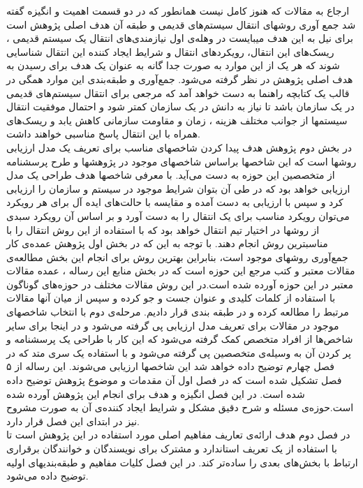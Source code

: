 ارجاع به مقالات که هنوز کامل نیست
همانطور که در دو قسمت اهمیت و انگیزه گفته شد جمع آوری روشهای انتقال سیستم‌های قدیمی و طبقه آن هدف اصلی پژوهش است برای نیل به این هدف میبایست در وهله‌ی اول نیازمندی‌های انتقال یک سیستم قدیمی ، ریسک‌های این انتقال،  رویکردهای انتقال و شرایط ایجاد کننده این انتقال شناسایی شوند که هر یک از این موارد به صورت جدا گانه  به عنوان یک هدف برای رسیدن به هدف اصلی پژوهش در نظر گرفته می‌شود. جمع‌آوری و طبقه‌بندی این موارد همگی در قالب یک کتابچه راهنما به دست خواهد آمد که مرجعی برای انتقال سیستم‌های قدیمی در یک سازمان باشد تا نیاز به دانش در یک سازمان کمتر شود و احتمال موفقیت انتقال سیستمها از جوانب مختلف هزینه ، زمان و 
مقاومت سازمانی کاهش یابد و ریسک‌های همراه با این انتقال پاسخ مناسبی خواهند داشت.
\\
در بخش دوم پژوهش هدف پیدا کردن شاخصهای مناسب برای تعریف یک مدل ارزیابی روشها است که این شاخصها براساس شاخصهای موجود در پژوهشها و طرح پرسشنامه از متخصصین این حوزه به دست می‌آید. با معرفی شاخصها هدف طراحی یک مدل ارزیابی خواهد بود که در طی آن  بتوان شرایط موجود در سیستم و سازمان را ارزیابی کرد و سپس با ارزیابی به دست آمده و مقایسه با حالت‌های ایده آل برای هر رویکرد می‌توان رویکرد مناسب برای یک انتقال را به دست آورد و بر اساس آن رویکرد سبدی از روشها در اختیار تیم انتقال خواهد بود که با استفاده از این  روش انتقال را با مناسبترین روش انجام دهند.
با توجه به این که در بخش اول پژوهش عمده‌ی کار جمع‌آوری روشهای موجود است، بنابراین بهترین روش برای انجام این بخش مطالعه‌ی مقالات معتبر و کتب مرجع این حوزه است که در بخش منابع این رساله ، عمده مقالات معتبر در این حوزه آورده شده است.در این روش مقالات مختلف در حوزه‌های گوناگون با استفاده از کلمات کلیدی و عنوان  جست و جو کرده و سپس از میان   آنها مقالات مرتبط را مطالعه کرده و در طبقه بندی قرار دادیم. مرحله‌ی دوم با انتخاب شاخصهای موجود در مقالات برای تعریف مدل ارزیابی پی گرفته می‌شود و در اینجا برای سایر شاخص‌ها از افراد متخصص کمک گرفته می‌شود که این کار با طراحی یک پرسشنامه و پر کردن آن به وسیله‌ی متخصصین پی گرفته می‌شود و با استفاده یک سری متد که در فصل  چهارم توضیح داده خواهد شد این شاخصها ارزیابی می‌شوند.
این رساله از ۵ فصل تشکیل شده است که در فصل اول آن مقدمات و موضوع پژوهش توضیح داده شده است. در این فصل  انگیزه و هدف  برای انجام این پژوهش  آورده شده است.حوزه‌ی مسئله و شرح دقیق مشکل و شرایط ایجاد کننده‌ی آن به صورت مشروح نیز در ابتدای این فصل قرار دارد. 
\\
در فصل دوم هدف ارائه‌ی تعاریف مفاهیم اصلی مورد استفاده در این پژوهش است تا با استفاده از یک تعریف استاندارد و مشترک برای نویسندگان و خوانندگان  برقراری ارتباط با بخش‌های بعدی  را ساد‌ه‌تر کند. در این فصل کلیات مفاهیم و طبقه‌بندیهای اولیه توضیح داده می‌شود.
